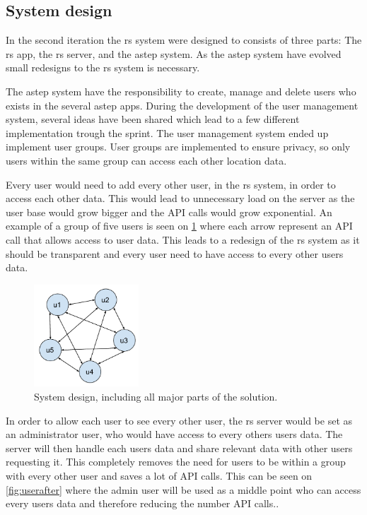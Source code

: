 \subsection{System design}

In the second iteration the \gls{rs} system were designed to consists of three parts: The \gls{rs} app, the \gls{rs} server, and the \gls{astep} system.
As the \gls{astep} system have evolved small redesigns to the \gls{rs} system is necessary.

The \gls{astep} system have the responsibility to create, manage and delete users who exists in the several \gls{astep} apps.
During the development of the user management system, several ideas have been shared which lead to a few different implementation trough the sprint.
The user management system ended up implement user groups.
User groups are implemented to ensure privacy, so only users within the same group can access each other location data.

Every user would need to add every other user, in the \gls{rs} system, in order to access each other data. This would lead to unnecessary load on the server as the user base would grow bigger and the API calls would grow exponential.
An example of a group of five users is seen on \ref{fig:userbefore} where each arrow represent an API call that allows access to user data.
This leads to a redesign of the \gls{rs} system as it should be transparent and every user need to have access to every other users data.

\begin{figure}[!h]
	\centering
	\includegraphics[width=0.35\textwidth]{figures/userbefore.pdf}
	\caption{System design, including all major parts of the solution.}
	\label{fig:userbefore}
\end{figure}

In order to allow each user to see every other user, the \gls{rs} server would be set as an administrator user, who would have access to every others users data.
The server will then handle each users data and share relevant data with other users requesting it. 
This completely removes the need for users to be within a group with every other user and saves a lot of API calls.
This can be seen on \ref{fig:userafter} where the admin user will be used as a middle point who can access every users data and therefore reducing the number API calls..

